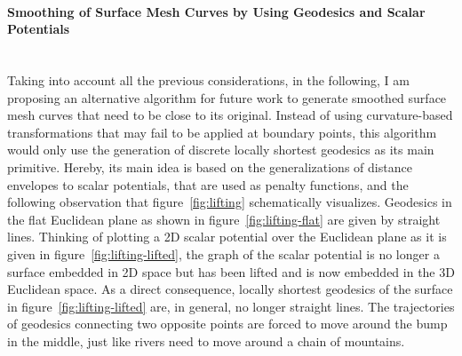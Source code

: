\documentclass[crop=false]{stdlocal}
\begin{document}
  \paragraph{Smoothing of Surface Mesh Curves by Using Geodesics and Scalar Potentials}\hfill\\
  Taking into account all the previous considerations, in the following, I am proposing an alternative algorithm for future work to generate smoothed surface mesh curves that need to be close to its original.
  Instead of using curvature-based transformations that may fail to be applied at boundary points, this algorithm would only use the generation of discrete locally shortest geodesics as its main primitive.
  Hereby, its main idea is based on the generalizations of distance envelopes to scalar potentials, that are used as penalty functions, and the following observation that figure~\ref{fig:lifting} schematically visualizes.
  Geodesics in the flat Euclidean plane as shown in figure~\ref{fig:lifting-flat} are given by straight lines.
  Thinking of plotting a 2D scalar potential over the Euclidean plane as it is given in figure~\ref{fig:lifting-lifted}, the graph of the scalar potential is no longer a surface embedded in 2D space but has been lifted and is now embedded in the 3D Euclidean space.
  As a direct consequence, locally shortest geodesics of the surface in figure~\ref{fig:lifting-lifted} are, in general, no longer straight lines.
  The trajectories of geodesics connecting two opposite points are forced to move around the bump in the middle, just like rivers need to move around a chain of mountains.
\end{document}
